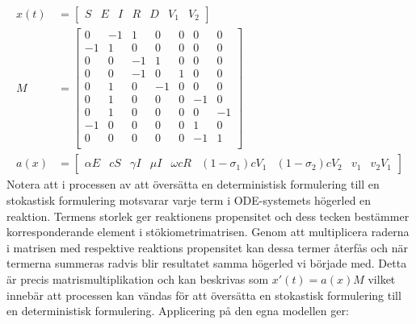 \documentclass[11pt,a4paper]{article}
\begin{document}
\begin{align*}
    x(t) & = \begin{bmatrix} S & E & I & R & D & V_1 & V_2 \end{bmatrix} \\
    M    & = \begin{bmatrix}
                 0  & -1 & 1  & 0  & 0 & 0  & 0  \\
                 -1 & 1  & 0  & 0  & 0 & 0  & 0  \\
                 0  & 0  & -1 & 1  & 0 & 0  & 0  \\
                 0  & 0  & -1 & 0  & 1 & 0  & 0  \\
                 0  & 1  & 0  & -1 & 0 & 0  & 0  \\
                 0  & 1  & 0  & 0  & 0 & -1 & 0  \\
                 0  & 1  & 0  & 0  & 0 & 0  & -1 \\
                 -1 & 0  & 0  & 0  & 0 & 1  & 0  \\
                 0  & 0  & 0  & 0  & 0 & -1 & 1  \\
             \end{bmatrix}                             \\
    a(x) & =\begin{bmatrix}
                \alpha E           &
                c S                &
                \gamma I           &
                \mu I              &
                \omega c R         &
                (1-\sigma_1) c V_1 &
                (1-\sigma_2) c V_2 &
                v_1                &
                v_2 V_1
            \end{bmatrix}
\end{align*}
Notera att i processen av att översätta en deterministisk formulering till en stokastisk formulering motsvarar varje term i ODE-systemets högerled en reaktion. Termens storlek ger reaktionens propensitet och dess tecken bestämmer korresponderande element i stökiometrimatrisen. Genom att multiplicera raderna i matrisen med respektive reaktions propensitet kan dessa termer återfås och när termerna summeras radvis blir resultatet samma högerled vi började med. Detta är precis matrismultiplikation och kan beskrivas som \(x'(t) = a(x) M\) vilket innebär att processen kan vändas för att översätta en stokastisk formulering till en deterministisk formulering. Applicering på den egna modellen ger:
\end{document}
